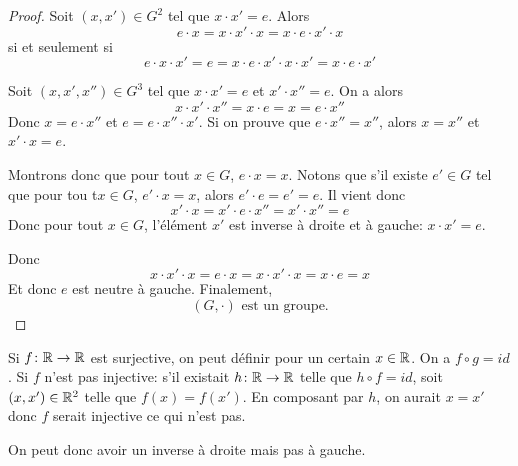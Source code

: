 \begin{proof}
	Soit $(x,x')\in G^{2}$ tel que $x\cdot x'=e$. Alors 
	\begin{equation}
		e\cdot x=x\cdot x'\cdot x =x\cdot e\cdot x'\cdot x
	\end{equation}
	si et seulement si 
	\begin{equation}
		e\cdot x\cdot x'=e=x\cdot e\cdot x'\cdot x\cdot x'=x\cdot e \cdot	x'
	\end{equation}

	Soit $(x,x',x'')\in G^{3}$ tel que $x\cdot x'=e$ et $x'\cdot x''=e$. On a alors 
	\begin{equation}
		x\cdot x'\cdot x''=x\cdot e = x = e\cdot x''
	\end{equation}
	Donc $x=e\cdot x''$ et $e=e\cdot x''\cdot x'$. Si on prouve que $e\cdot x''=x''$, alors $x=x''$ et $x'\cdot x=e$.

	Montrons donc que pour tout $x\in G$, $e\cdot x=x$. Notons que s'il existe $e'\in G$ tel que pour tou t$x\in G$, $e'\cdot x=x$, alors $e'\cdot e=e'=e$.
	Il vient donc 
	\begin{equation}
		x'\cdot x=x'\cdot e\cdot x''=x'\cdot x''=e
	\end{equation}
	Donc pour tout $x\in G$, l'élément $x'$ est inverse à droite et à gauche: $x\cdot x'=e$.

	Donc 
	\begin{equation}
		x\cdot x'\cdot x=e\cdot x =x\cdot x'\cdot x=x\cdot e=x
	\end{equation}
	Et donc $e$ est neutre à gauche. Finalement, 
	\begin{equation}
		\boxed{(G,\cdot)\text{ est un groupe.}}
	\end{equation}
\end{proof}

\begin{remark}
	Si $f\colon\mathbb{R}\to\mathbb{R}$ est surjective, on peut définir  pour un certain $x\in\mathbb{R}$. On a $f\circ g=id$. Si $f$ n'est pas injective: s'il existait $h\colon\mathbb{R}\to\mathbb{R}$ telle que $h\circ f=id$, soit $(x,x')\in \mathbb{R}^{2}$ telle que $f(x)=f(x')$. En composant par $h$, on aurait $x=x'$ donc $f$ serait injective ce qui n'est pas. 

	On peut donc avoir un inverse à droite mais pas à gauche.
\end{remark}

